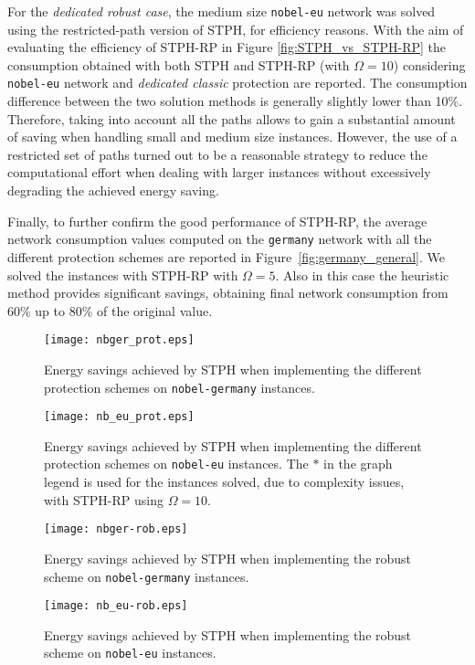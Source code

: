 \documentclass[final,5p,times,twocolumn]{elsarticle}
\begin{document}
For the \textit{dedicated robust case}, the medium size {\tt nobel-eu} network was solved using the restricted-path version of STPH, for efficiency reasons. With the aim of evaluating the efficiency of STPH-RP  in Figure \ref{fig:STPH_vs_STPH-RP} the consumption obtained with both STPH and STPH-RP (with $\Omega = 10$) considering {\tt nobel-eu} network and \textit{dedicated classic} protection are reported. The consumption difference between the two solution methods is generally slightly lower than 10\%. Therefore, taking into account all the paths allows to gain a substantial amount of saving when handling small and medium size instances. However, the use of a restricted set of paths turned out to be a reasonable strategy to reduce the computational effort when dealing with larger instances without excessively degrading the achieved energy saving.

Finally, to further confirm the good performance of STPH-RP, the average network consumption values computed on the {\tt germany} network with all the different protection schemes are reported in Figure~\ref{fig:germany_general}. We solved the instances with STPH-RP with $\Omega = 5$. Also in this case the heuristic method provides significant savings, obtaining final network consumption from 60\% up to 80\% of the original value.



\begin{figure*}[t]\centering
  \texttt{[image: nbger\_prot.eps]}
  \caption{Energy savings achieved by STPH when implementing the different protection schemes on {\tt nobel-germany} instances.}
  \label{fig:nob_germany}
\texttt{[image: nb\_eu\_prot.eps]}
\caption{Energy savings achieved by STPH when implementing the different protection schemes on {\tt nobel-eu} instances. The $\ast$ in the graph legend is used for the instances solved, due to complexity issues, with STPH-RP using $\Omega=10$. }
  \label{fig:nob_eu_general}
\end{figure*}

\begin{figure*}[t]\centering
  \texttt{[image: nbger-rob.eps]}
  \label{fig:nbger_robust_analysis}
  \caption{Energy savings achieved by STPH when implementing the robust scheme on {\tt nobel-germany} instances.}
  \texttt{[image: nb\_eu-rob.eps]}
  \label{fig:nb_eu_robust_analysis}
  \caption{Energy savings achieved by STPH when implementing the robust scheme on {\tt nobel-eu} instances.}
\end{figure*}
\end{document}
